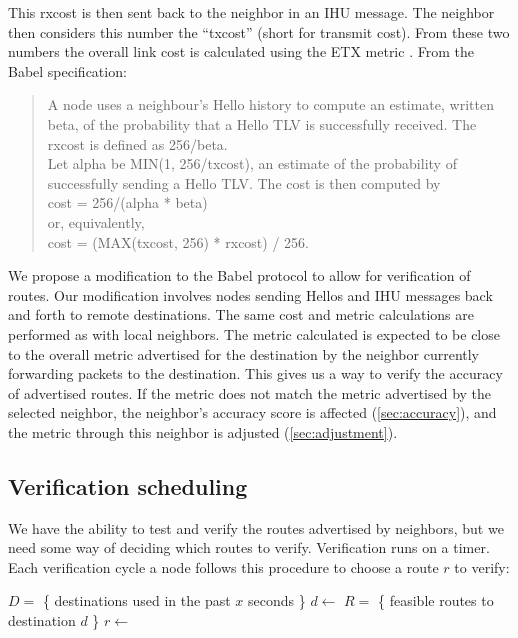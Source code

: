 \documentclass[11pt]{article}
\begin{document}
This rxcost is then sent back to the neighbor in an IHU message. The neighbor then considers this number the ``txcost'' (short for transmit cost). From these two numbers the overall link cost is calculated using the ETX metric \cite{etx}. From the Babel specification:

\begin{quote}
A node uses a neighbour's Hello history to compute an estimate,
written beta, of the probability that a Hello TLV is successfully
received.  The rxcost is defined as 256/beta.\\

Let alpha be MIN(1, 256/txcost), an estimate of the probability of
successfully sending a Hello TLV.  The cost is then computed by\\

   cost = 256/(alpha * beta)\\

or, equivalently,\\

   cost = (MAX(txcost, 256) * rxcost) / 256.\\

\end{quote}

We propose a modification to the Babel protocol to allow for verification of routes. Our modification involves nodes sending Hellos and IHU messages back and forth to remote destinations. The same cost and metric calculations are performed as with local neighbors. The metric calculated is expected to be close to the overall metric advertised for the destination by the neighbor currently forwarding packets to the destination. This gives us a way to verify the accuracy of advertised routes. If the metric does not match the metric advertised by the selected neighbor, the neighbor’s accuracy score is affected (\autoref{sec:accuracy}), and the metric through this neighbor is adjusted (\autoref{sec:adjustment}).

\subsection{Verification scheduling}
We have the ability to test and verify the routes advertised by neighbors, but we need some way of deciding which routes to verify. Verification runs on a timer. Each verification cycle a node follows this procedure to choose a route $r$ to verify:

\noindent
\begin{minipage}[c]{\textwidth}
\vspace{\abovedisplayskip}
\begin{algorithmic}
\State $D=$ \{ destinations used in the past $x$ seconds \}
\State $d\gets$ 
\State $R=$ \{ feasible routes to destination $d$ \}
\State $r\gets$ 
\end{algorithmic}
\vspace{\belowdisplayskip}
\end{minipage}
\end{document}
